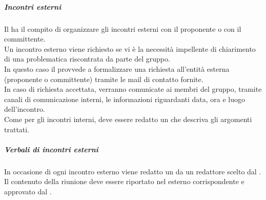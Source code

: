 \subparagraph*{Incontri esterni}
Il \roleProjectManagerLow{} ha il compito di organizzare gli incontri esterni con il proponente o con il committente.\\
Un incontro esterno viene richiesto se vi è la necessità impellente di chiarimento di una problematica riscontrata da parte del gruppo.\\
In questo caso il \roleProjectManagerLow{} provvede a formalizzare una richiesta all'entità esterna (proponente o committente) tramite le mail di contatto fornite.\\
In caso di richiesta accettata, verranno comunicate ai membri del gruppo, tramite canali di comunicazione interni, le informazioni riguardanti data, ora e luogo dell'incontro.\\
Come per gli incontri interni, deve essere redatto un \docNameVLow{} che descriva gli argomenti trattati.
\subparagraph {\textit{Verbali} di incontri esterni}
In occasione di ogni incontro esterno viene redatto un \docNameVLow{} da un redattore scelto dal \roleProjectManagerLow. Il contenuto della riunione deve essere riportato nel \docNameVLow{} esterno corrispondente e approvato dal \roleProjectManagerLow.

